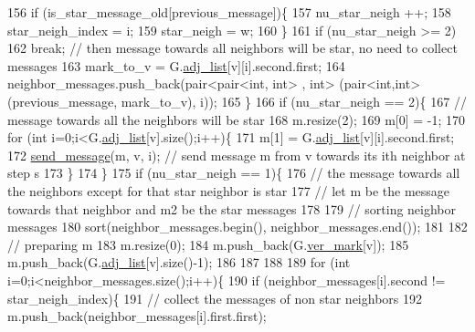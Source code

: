 \begin{DoxyCode}
156             \textcolor{keywordflow}{if} (is\_star\_message\_old[previous\_message])\{
157               nu\_star\_neigh ++;
158               star\_neigh\_index = i;
159               star\_neigh = w;
160             \}
161             \textcolor{keywordflow}{if} (nu\_star\_neigh >= 2)
162               \textcolor{keywordflow}{break}; \textcolor{comment}{// then message towards all neighbors will be star, no need to collect messages}
163             mark\_to\_v = G.\hyperlink{classmarked__graph_a1a0bf7ca413a278763f7c878b3b6fd6f}{adj\_list}[v][i].second.first;
164             neighbor\_messages.push\_back(pair<pair<int, int> , \textcolor{keywordtype}{int}> (pair<int,int>(previous\_message, 
      mark\_to\_v), i));
165           \}
166           \textcolor{keywordflow}{if} (nu\_star\_neigh == 2)\{
167             \textcolor{comment}{// message towards all the neighbors will be star}
168             m.resize(2);
169             m[0] = -1;
170             \textcolor{keywordflow}{for} (\textcolor{keywordtype}{int} i=0;i<G.\hyperlink{classmarked__graph_a1a0bf7ca413a278763f7c878b3b6fd6f}{adj\_list}[v].size();i++)\{
171               m[1] = G.\hyperlink{classmarked__graph_a1a0bf7ca413a278763f7c878b3b6fd6f}{adj\_list}[v][i].second.first; 
172               \hyperlink{classgraph__message_aa76d1d5420a12477fa1dddd878d78c8f}{send\_message}(m, v, i); \textcolor{comment}{// send message m from v towards its ith neighbor at step
       s}
173             \}
174           \}
175           \textcolor{keywordflow}{if} (nu\_star\_neigh == 1)\{
176             \textcolor{comment}{// the message towards all the neighbors except for that star neighbor is star}
177             \textcolor{comment}{// let m be the message towards that neighbor and m2 be the star messages}
178 
179             \textcolor{comment}{// sorting neighbor messages}
180             sort(neighbor\_messages.begin(), neighbor\_messages.end());
181 
182             \textcolor{comment}{// preparing m }
183             m.resize(0);
184             m.push\_back(G.\hyperlink{classmarked__graph_ac83e9377dd4d8bb95be1ac949b127296}{ver\_mark}[v]);
185             m.push\_back(G.\hyperlink{classmarked__graph_a1a0bf7ca413a278763f7c878b3b6fd6f}{adj\_list}[v].size()-1);
186 
187             
188 
189             \textcolor{keywordflow}{for} (\textcolor{keywordtype}{int} i=0;i<neighbor\_messages.size();i++)\{
190               \textcolor{keywordflow}{if} (neighbor\_messages[i].second != star\_neigh\_index)\{
191                 \textcolor{comment}{// collect the messages of non star neighbors}
192                 m.push\_back(neighbor\_messages[i].first.first);

\end{DoxyCode}
